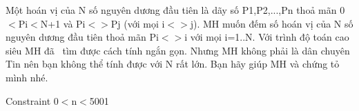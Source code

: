 Một hoán vị của N số nguyên dương đầu tiên là dãy số P1,P2,...,Pn thoả mãn 0$<$Pi$<$N+1 và Pi$<$$>$Pj (với mọi i$<$$>$j). MH muốn đếm số hoán vị của N số nguyên dương đầu tiên thoả mãn Pi$<$$>$i với mọi i=1..N. Với trình độ toán cao siêu MH đã  tìm được cách tính ngắn gọn. Nhưng MH không phải là dân chuyên Tin nên bạn không thể tính được với N rất lớn. Bạn hãy giúp MH và chứng tỏ mình nhé.  

Constraint
0$<$n$<$5001